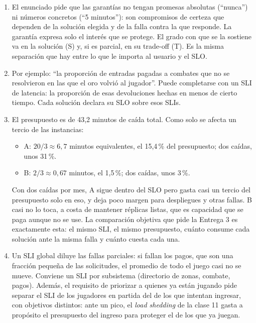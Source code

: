 \documentclass[variant=guia,cover=institutional,mode=screen]{ua-engineering-v6-article}
\begin{document}
\begin{uaanswer}
\begin{enumerate}
\item El enunciado pide que las garantías no tengan promesas absolutas (``nunca'') ni números concretos (``5 minutos''): son compromisos de certeza que dependen de la solución elegida y de la falla contra la que responde. La garantía expresa solo el interés que se protege. El grado con que se la sostiene va en la solución (S) y, si es parcial, en su trade-off (T). Es la misma separación que hay entre lo que le importa al usuario y el SLO.
\item Por ejemplo: ``la proporción de entradas pagadas a combates que no se resolvieron en las que el oro volvió al jugador''. Puede completarse con un SLI de latencia: la proporción de esas devoluciones hechas en menos de cierto tiempo. Cada solución declara su SLO sobre esos SLIs.
\item El presupuesto es de 43,2 minutos de caída total. Como solo se afecta un tercio de las instancias:
\begin{itemize}
\item A: $20 / 3 \approx 6{,}7$ minutos equivalentes, el 15,4\,\% del presupuesto; dos caídas, unos 31\,\%.
\item B: $2/3 \approx 0{,}67$ minutos, el 1,5\,\%; dos caídas, unos 3\,\%.
\end{itemize}
Con dos caídas por mes, A sigue dentro del SLO pero gasta casi un tercio del presupuesto solo en eso, y deja poco margen para despliegues y otras fallas. B casi no lo toca, a costa de mantener réplicas listas, que es capacidad que se paga aunque no se use. La comparación objetiva que pide la Entrega 3 es exactamente esta: el mismo SLI, el mismo presupuesto, cuánto consume cada solución ante la misma falla y cuánto cuesta cada una.
\item Un SLI global diluye las fallas parciales: si fallan los pagos, que son una fracción pequeña de las solicitudes, el promedio de todo el juego casi no se mueve. Conviene un SLI por subsistema (directorio de zonas, combate, pagos). Además, el requisito de priorizar a quienes ya están jugando pide separar el SLI de los jugadores en partida del de los que intentan ingresar, con objetivos distintos: ante un pico, el \emph{load shedding} de la clase 11 gasta a propósito el presupuesto del ingreso para proteger el de los que ya juegan.
\end{enumerate}
\end{uaanswer}
\end{document}

